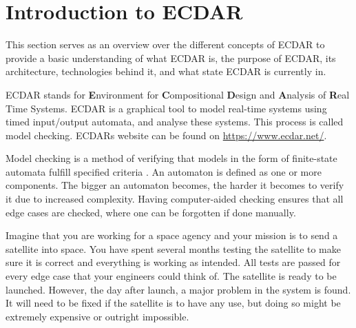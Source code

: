 \section{Introduction to ECDAR}\label{sec:introduction-to-ecdar}
\commondisclaimer

This section serves as an overview over the different concepts of ECDAR to provide a basic understanding of what ECDAR is, the purpose of ECDAR, its architecture, technologies behind it, and what state ECDAR is currently in.

ECDAR stands for \textbf{E}nvironment for \textbf{C}ompositional \textbf{D}esign and \textbf{A}nalysis of \textbf{R}eal Time Systems.
ECDAR is a graphical tool to model real-time systems using timed input/output automata, and analyse these systems. 
This process is called model checking. ECDARs website can be found on \href{https://www.ecdar.net/}{https://www.ecdar.net/}.

Model checking is a method of verifying that models in the form of finite-state automata fulfill specified criteria \cite{modelchecking-handbook}. 
An automaton is defined as one or more components.
The bigger an automaton becomes, the harder it becomes to verify it due to increased complexity. 
Having computer-aided checking ensures that all edge cases are checked, where one can be forgotten if done manually.
 

Imagine that you are working for a space agency and your mission is to send a satellite into space.
You have spent several months testing the satellite to make sure it is correct and everything is working as intended.
All tests are passed for every edge case that your engineers could think of.
The satellite is ready to be launched.
However, the day after launch, a major problem in the system is found. 
It will need to be fixed if the satellite is to have any use, but doing so might be extremely expensive or outright impossible.

